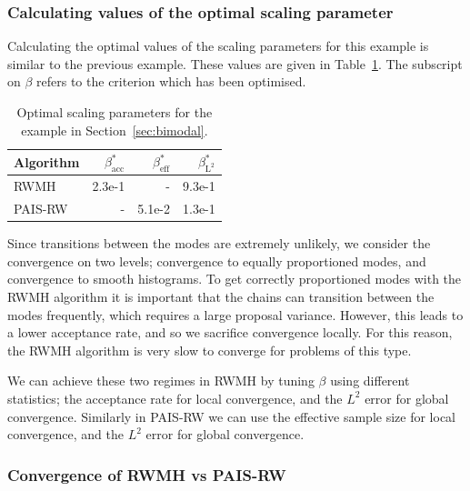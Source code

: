 \documentclass[final]{siamltex}
\begin{document}

\subsubsection{Calculating values of the optimal scaling parameter}
\label{sec:BM2_opt_beta}

Calculating the optimal values of the scaling parameters for this
example is similar to the previous example. These values are given in
Table~\ref{tab:BM2_opt_delta}. The subscript on $\beta$ refers to the
criterion which has been optimised.

\begin{table}[!htb]
      \centering
        \begin{tabular}{|l|r|r|r|}
	\hline
	Algorithm							& $\beta^*_{\text{acc}}$	& $\beta^*_{\text{eff}}$	& $\beta^*_{\text{L}^2}$ \\ \hline
	RWMH								& 2.3e-1					& - 						& 9.3e-1\\
	PAIS-RW								& -						& 5.1e-2 					& 1.3e-1\\
	\hline
	\end{tabular}
	\vspace{2mm}
	\caption{Optimal scaling parameters for the example in Section~\ref{sec:bimodal}.}
	\label{tab:BM2_opt_delta}
\end{table}

Since transitions between the modes are extremely unlikely, we
consider the convergence on two levels; convergence to equally
proportioned modes, and convergence to smooth histograms.
To get correctly proportioned modes with the RWMH algorithm it is
important that the chains can transition between the modes frequently,
which requires a large proposal variance. However, this leads to a
lower acceptance rate, and so we sacrifice convergence locally. For
this reason, the RWMH algorithm is very slow to converge for problems
of this type.

We can achieve these two regimes in RWMH by tuning $\beta$ using
different statistics; the acceptance rate for local convergence, and
the $L^2$ error for global convergence. Similarly in PAIS-RW we can
use the effective sample size for local convergence, and the $L^2$
error for global convergence.


\subsubsection{Convergence of RWMH vs PAIS-RW}
\end{document}
